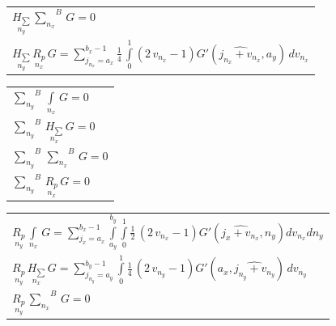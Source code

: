 \documentclass[twoside, 10pt, ptm]{article}
\begin{document}
\begin{multicols}{2}
\begin{center}
\begin{tabular}{ l }
$\underset{n_y}{H_{\sum}}\,{\sum\limits_{n_x}^{}}^{B}\,G = 0$ \\

$\underset{n_y}{H_{\sum}}\,\underset{n_x}{R_{p}}\,G = {\sum\limits_{j_{n_{x}}=a_{x}}^{b_{x} - 1} \frac{1}{4} \, \int\limits_{0}^{1} \left(2 \, v_{n_{x}} - 1 \right) G'\left(\widehat{j_{n_{x}} + v_{n_{x}}}, a_{y}\right)\,{d v_{n_{x}}} }$ \\


\end{tabular}
\end{center}

    \begin{center}
\begin{tabular}{ l }


${\sum\limits_{n_y}^{}}^{B}\,\int\limits_{n_x}^{}\,G = 0$ \\

${\sum\limits_{n_y}^{}}^{B}\,\underset{n_x}{H_{\sum}}\,G = 0$ \\

${\sum\limits_{n_y}^{}}^{B}\,{\sum\limits_{n_x}^{}}^{B}\,G = 0$ \\

${\sum\limits_{n_y}^{}}^{B}\,\underset{n_x}{R_{p}}\,G = 0$ \\


\end{tabular}
\end{center}

    \begin{center}
\begin{tabular}{ l }


$\underset{n_y}{R_{p}}\,\int\limits_{n_x}^{}\,G = {\sum\limits_{j_{x}=a_{x}}^{b_{x} - 1} \int\limits_{a_{y}}^{b_{y}} \int\limits_{0}^{1} \frac{1}{2} \, {\left(2 \, v_{n_{x}} - 1\right)} G'\left(\widehat{j_{x} + v_{n_{x}}}, n_{y}\right){d v_{n_{x}}}{d n_{y}}}$ \\

$\underset{n_y}{R_{p}}\,\underset{n_x}{H_{\sum}}\,G = {\sum\limits_{j_{n_{y}}=a_{y}}^{b_{y} - 1} \int\limits_{0}^{1} \frac{1}{4} \, {\left(2 \, v_{n_{y}} - 1\right)} G'\left(a_{x}, \widehat{j_{n_{y}} + v_{n_{y}}}\right)\,{d v_{n_{y}}}}$ \\

$\underset{n_y}{R_{p}}\,{\sum\limits_{n_x}^{}}^{B}\,G = 0$ \\


\end{tabular}
\end{center}
\end{multicols}
\end{document}
